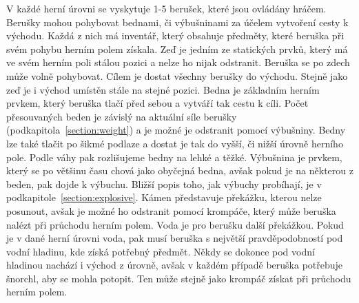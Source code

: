 V každé herní úrovni se vyskytuje 1-5 berušek, které jsou ovládány hráčem. Berušky mohou pohybovat bednami, či výbušninami za účelem vytvoření cesty k východu. Každá z nich má inventář, který obsahuje předměty, které beruška při svém pohybu herním polem získala. 
Zeď je jedním ze statických prvků, který má ve svém herním poli stálou pozici a nelze ho nijak odstranit. Beruška se po zdech může volně pohybovat.
Cílem je dostat všechny berušky do východu. Stejně jako zeď je i východ umístěn stále na stejné pozici.
Bedna je základním herním prvkem, který beruška tlačí před sebou a vytváří tak cestu k cíli. Počet přesouvaných beden je závislý na aktuální síle berušky (podkapitola~\ref{section:weight}) a je možné je odstranit pomocí výbušniny. Bedny lze také tlačit po šikmé podlaze a dostat je tak do vyšší, či nižší úrovně herního pole. Podle váhy pak rozlišujeme bedny na lehké a těžké.
Výbušnina je prvkem, který se po většinu času chová jako obyčejná bedna, avšak pokud je  na některou z beden, pak dojde k výbuchu. Bližší popis toho, jak výbuchy probíhají, je v podkapitole~\ref{section:explosive}.
Kámen představuje překážku, kterou nelze posunout, avšak je možné ho odstranit pomocí krompáče, který může beruška nalézt při průchodu herním polem.
Voda je pro berušku další překážkou. Pokud je v dané herní úrovni voda, pak musí beruška s největší pravděpodobností pod vodní hladinu, kde získá potřebný předmět. Někdy se dokonce pod vodní hladinou nachází i východ z úrovně, avšak v každém případě beruška potřebuje šnorchl, aby se mohla potopit. Ten může stejně jako krompáč získat při průchodu herním polem. 
